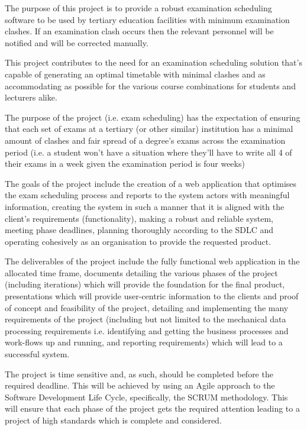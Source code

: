 \documentclass{article}
\begin{document}
The purpose of this project is to provide a robust examination scheduling software to be used by tertiary education facilities with minimum examination clashes. If an examination clash occurs then the relevant personnel will be notified and will be corrected manually.

This project contributes to the need for an examination scheduling solution that's capable of generating an optimal timetable with minimal clashes and as accommodating as possible for the various course combinations for students and lecturers alike.

The purpose of the project (i.e. exam scheduling) has the expectation of ensuring that each set of exams at a tertiary (or other similar) institution has a minimal amount of clashes and fair spread of a degree's exams across the examination period (i.e. a student won't have a situation where they'll have to write all 4 of their exams in a week given the examination period is four weeks)

The goals of the project include the creation of a web application that optimises the exam scheduling process and reports to the system actors with meaningful information, creating the system in such a manner that it is aligned with the client's requirements (functionality), making a robust and reliable system, meeting phase deadlines, planning thoroughly according to the SDLC and operating cohesively as an organisation to provide the requested product.

The deliverables of the project include the fully functional web application in the allocated time frame, documents detailing the various phases of the project (including iterations) which will provide the foundation for the final product, presentations which will provide user-centric information to the clients and proof of concept and feasibility of the project, detailing and implementing the many requirements of the project (including but not limited to the mechanical data processing requirements i.e. identifying and getting the business processes and work-flows up and running, and reporting requirements) which will lead to a successful system.

The project is time sensitive and, as such, should be completed before the required deadline. This will be achieved by using an Agile approach to the Software Development Life Cycle, specifically, the SCRUM methodology. This will ensure that each phase of the project gets the required attention leading to a project of high standards which is complete and considered.
\end{document}

